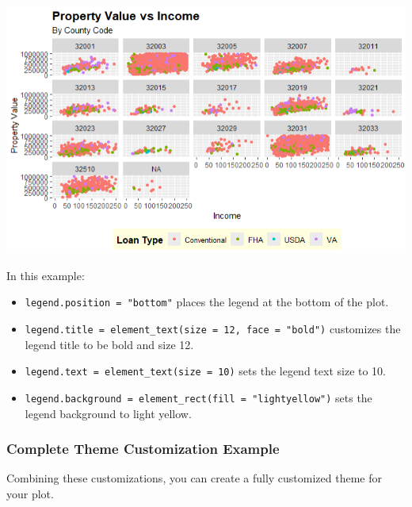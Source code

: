 \documentclass[
]{book}
\begin{document}
\includegraphics{images/custom_theme_3.PNG}

In this example:

\begin{itemize}
\item
  \texttt{legend.position\ =\ "bottom"} places the legend at the bottom of the plot.
\item
  \texttt{legend.title\ =\ element\_text(size\ =\ 12,\ face\ =\ "bold")} customizes the legend title to be bold and size 12.
\item
  \texttt{legend.text\ =\ element\_text(size\ =\ 10)} sets the legend text size to 10.
\item
  \texttt{legend.background\ =\ element\_rect(fill\ =\ "lightyellow")} sets the legend background to light yellow.
\end{itemize}

\hypertarget{complete-theme-customization-example}{%
\subsubsection*{Complete Theme Customization Example}\label{complete-theme-customization-example}}

Combining these customizations, you can create a fully customized theme for your plot.
\end{document}
